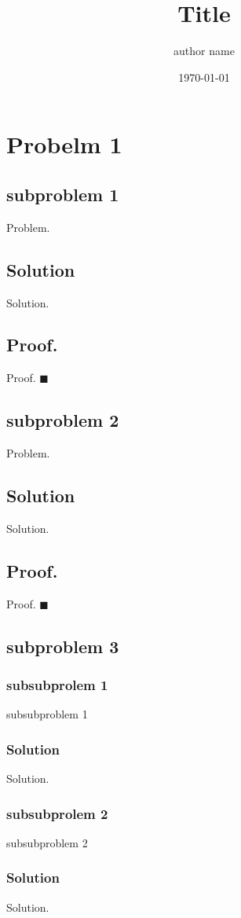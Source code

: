 \documentclass{article}
\title{Title}
\author{author name}
\date{\today}
\begin{document}
\maketitle

\section*{Probelm 1}
\subsection*{subproblem 1}
  Problem.
\subsection*{Solution}
  Solution.
 \subsection*{Proof.}
  Proof.
 $ \blacksquare $
\subsection*{subproblem 2}
  Problem.
\subsection*{Solution}
  Solution.
 \subsection*{Proof.}
  Proof.
 $ \blacksquare $
\subsection*{subproblem 3}
  	\subsubsection*{subsubprolem 1}
  	subsubproblem 1
	\subsubsection*{Solution}
  	Solution.
  	\subsubsection*{subsubprolem 2}
  	subsubproblem 2
	\subsubsection*{Solution}
  	Solution.
\end{document}
